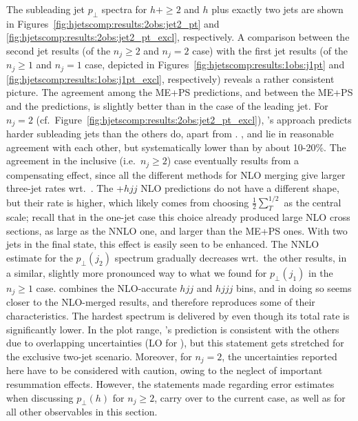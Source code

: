 The subleading jet $p_\perp$ spectra for $h+\ge2$ and $h$ plus exactly
two jets are shown in Figures~\ref{fig:hjetscomp:results:2obs:jet2_pt}
and \ref{fig:hjetscomp:results:2obs:jet2_pt_excl}, respectively. A
comparison between the second jet results (of the
$n_j\ge2$ and $n_j=2$ case) with the first jet results (of the
$n_j\ge1$ and $n_j=1$ case, depicted in
Figures~\ref{fig:hjetscomp:results:1obs:j1pt} and
\ref{fig:hjetscomp:results:1obs:j1pt_excl}, respectively) reveals a
rather consistent picture. The agreement among the ME+PS
predictions, and between the ME+PS and the \Powheg predictions, is
slightly better than in the case of the leading jet. For $n_j=2$
(cf.~Figure~\ref{fig:hjetscomp:results:2obs:jet2_pt_excl}), \Powheg's
\NNLOPS approach predicts harder subleading jets than the others do,
apart from \Hej. \MGaMC, \Sherpa and \Herwig lie in reasonable
agreement with each other, but systematically lower than \Powheg by
about 10-20\%. The agreement in the inclusive (i.e.~$n_j\ge2$) case
eventually results from a compensating effect, since all the different
methods for NLO merging give larger three-jet rates wrt.~\Powheg. The
\GoSam{}+\Sherpa $hjj$ NLO predictions do not have a different shape,
but their rate is higher, which likely comes from choosing
$\tfrac{1}{2}\sum_T^{1/2}$ as the central scale; recall that in the
one-jet case this choice already produced large NLO cross sections, as
large as the NNLO one, and larger than the ME+PS ones. With two jets
in the final state, this effect is easily seen to be enhanced. The
\Loopsim NNLO estimate for the $p_\perp(j_2)$ spectrum gradually
decreases wrt.~the other \GoSam results, in a similar, slightly more
pronounced way to what we found for $p_\perp(j_1)$ in the $n_j\ge1$
case. 
\Loopsim combines the NLO-accurate $hjj$ and $hjjj$ bins, and in doing
so  seems closer to the NLO-merged results, and therefore reproduces
some of their characteristics. The hardest spectrum is
delivered by \Hej even though its total rate is significantly lower. 
In the plot range, \Hej's prediction is consistent with the others due 
to overlapping uncertainties (LO for \Hej), but this statement gets
stretched for the exclusive two-jet scenario. Moreover, for $n_j=2$,
the   uncertainties reported here have to be considered with caution,
owing to the neglect of important resummation effects. However, the
statements made regarding error estimates when discussing 
$p_\perp(h)$ for $n_j\ge2$, carry over to the current case, as well as
for all other observables in this section.

